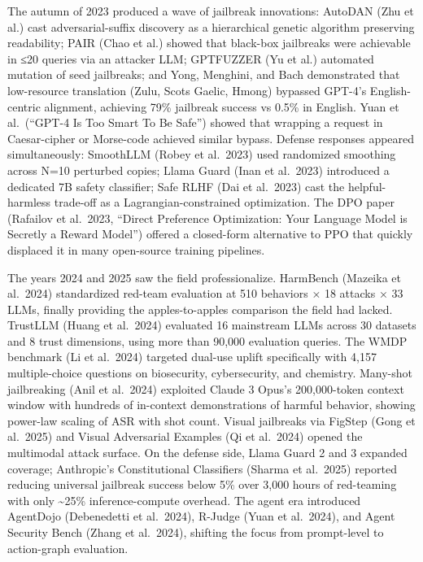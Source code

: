 \documentclass{article}
\begin{document}
The autumn of 2023 produced a wave of jailbreak innovations: AutoDAN (Zhu et al.) cast adversarial-suffix discovery as a hierarchical genetic algorithm preserving readability; PAIR (Chao et al.) showed that black-box jailbreaks were achievable in ≤20 queries via an attacker LLM; GPTFUZZER (Yu et al.) automated mutation of seed jailbreaks; and Yong, Menghini, and Bach demonstrated that low-resource translation (Zulu, Scots Gaelic, Hmong) bypassed GPT-4's English-centric alignment, achieving 79\% jailbreak success vs 0.5\% in English. Yuan et al.~(``GPT-4 Is Too Smart To Be Safe'') showed that wrapping a request in Caesar-cipher or Morse-code achieved similar bypass. Defense responses appeared simultaneously: SmoothLLM (Robey et al.~2023) used randomized smoothing across N=10 perturbed copies; Llama Guard (Inan et al.~2023) introduced a dedicated 7B safety classifier; Safe RLHF (Dai et al.~2023) cast the helpful-harmless trade-off as a Lagrangian-constrained optimization. The DPO paper (Rafailov et al.~2023, ``Direct Preference Optimization: Your Language Model is Secretly a Reward Model'') offered a closed-form alternative to PPO that quickly displaced it in many open-source training pipelines.

The years 2024 and 2025 saw the field professionalize. HarmBench (Mazeika et al.~2024) standardized red-team evaluation at 510 behaviors × 18 attacks × 33 LLMs, finally providing the apples-to-apples comparison the field had lacked. TrustLLM (Huang et al.~2024) evaluated 16 mainstream LLMs across 30 datasets and 8 trust dimensions, using more than 90,000 evaluation queries. The WMDP benchmark (Li et al.~2024) targeted dual-use uplift specifically with 4,157 multiple-choice questions on biosecurity, cybersecurity, and chemistry. Many-shot jailbreaking (Anil et al.~2024) exploited Claude 3 Opus's 200,000-token context window with hundreds of in-context demonstrations of harmful behavior, showing power-law scaling of ASR with shot count. Visual jailbreaks via FigStep (Gong et al.~2025) and Visual Adversarial Examples (Qi et al.~2024) opened the multimodal attack surface. On the defense side, Llama Guard 2 and 3 expanded coverage; Anthropic's Constitutional Classifiers (Sharma et al.~2025) reported reducing universal jailbreak success below 5\% over 3,000 hours of red-teaming with only \textasciitilde25\% inference-compute overhead. The agent era introduced AgentDojo (Debenedetti et al.~2024), R-Judge (Yuan et al.~2024), and Agent Security Bench (Zhang et al.~2024), shifting the focus from prompt-level to action-graph evaluation.
\end{document}
